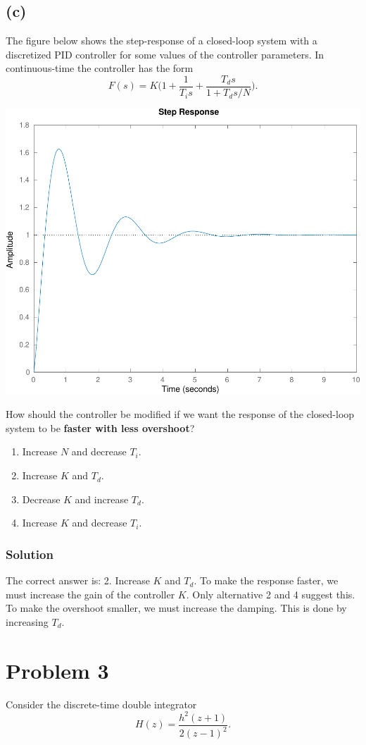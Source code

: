 \documentclass[a4paper]{scrartcl}
\begin{document}
\subsection*{(c)}
\label{sec-2-3}
The figure below shows the step-response of a closed-loop system with a discretized PID controller for some values of the controller parameters. In continuous-time the controller has the form
 \[ F(s) = K\Big(1 + \frac{1}{T_i s} + \frac{T_ds}{1 + T_ds/N}\Big). \]
\begin{center}
\includegraphics[width=0.4\linewidth]{tuned-response}
\end{center}
How should the controller be modified if we want the response of the closed-loop system to be \textbf{faster with less overshoot}?
\begin{enumerate}
\item Increase $N$ and decrease $T_i$.
\item Increase $K$ and $T_d$.
\item Decrease $K$ and increase $T_d$.
\item Increase $K$ and decrease $T_i$.
\end{enumerate}

\subsubsection*{Solution}
\label{sec-2-3-1}
The correct answer is:  2. Increase $K$ and $T_d$. To make the response faster, we must increase the gain of the controller $K$. Only alternative 2 and 4 suggest this. To make the overshoot smaller, we must increase the damping. This is done by increasing $T_d$. 


\section*{Problem 3}
\label{sec-3}
Consider the discrete-time double integrator
\[ H(z) = \frac{h^2(z+1)}{2(z-1)^2}. \]
\end{document}

